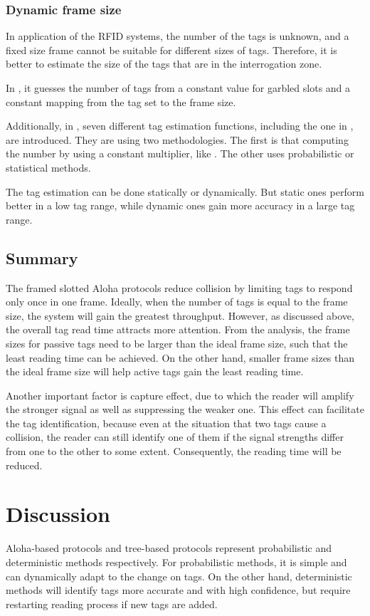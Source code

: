 \documentclass[12pt,letterpaper]{article}
\begin{document}
\subsubsection{Dynamic frame size}
In application of the RFID systems, the number of the tags is unknown,
and a fixed size frame cannot be suitable for different sizes of tags.
Therefore, it is better to estimate the size of the tags that are in 
the interrogation zone.

In \cite{frame}, it guesses the number of tags from a constant value 
for garbled slots and a constant mapping from the tag set to the 
frame size. 

Additionally, in \cite{survey}, seven different tag estimation functions,
including the one in \cite{frame}, are introduced. They are using two
methodologies. The first is that computing the number by using a 
constant multiplier, like \cite{frame}. The other uses probabilistic
or statistical methods. 

The tag estimation can be done statically or dynamically. But static
ones perform better in a low tag range, while dynamic ones
gain more accuracy in a large tag range.

\subsection{Summary}
The framed slotted Aloha protocols reduce collision by limiting tags
to respond only once in one frame. Ideally, when the number of tags
is equal to the frame size, the system will gain the greatest throughput.
However, as discussed above, the overall tag read time attracts more
attention. From the analysis, the frame sizes for passive tags need to 
be larger than the ideal frame size, such that the least reading time
can be achieved. On the other hand, smaller frame sizes than the ideal
frame size will help active tags gain the least reading time. 

Another important factor is capture effect, due to which the reader 
will amplify the stronger signal as well as suppressing the weaker 
one. This effect can facilitate the tag identification, because even
at the situation that two tags cause a collision, the reader can still
identify one of them if the signal strengths differ from one to 
the other to some extent. Consequently, the reading time will be
reduced. 
\section{Discussion}
Aloha-based protocols and tree-based protocols represent probabilistic
and deterministic methods respectively. For probabilistic methods, it is 
simple and can dynamically adapt to the change on tags. On the other 
hand, deterministic methods will identify tags more accurate and with
high confidence, but require restarting reading process if new tags are
added. 
\end{document}
